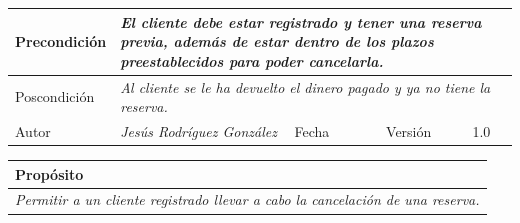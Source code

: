 \begin{table}[H]
\begin{tabular}{llllllll}
        \multicolumn{1}{|l|}{Precondición}                           & \multicolumn{7}{p{10cm}|}{{\color[HTML]{808080} \textit{El cliente debe estar registrado y tener una reserva previa, además de estar dentro de los plazos preestablecidos para poder cancelarla.}}}                                                                                                                                                                                                                                   \\ \hline
        \multicolumn{1}{|l|}{Poscondición}                           & \multicolumn{7}{p{10cm}|}{{\color[HTML]{808080} \textit{Al cliente se le ha devuelto el dinero pagado y ya no tiene la reserva.}}}                                                                                                                                                                                                                                                       \\ \hline
        \multicolumn{1}{|l|}{Autor}                                  & \multicolumn{1}{l|}{{\color[HTML]{808080} \textit{Jesús Rodríguez González}}}                           & \multicolumn{2}{l|}{Fecha}                                                   & \multicolumn{1}{l|}{}                          & \multicolumn{2}{l|}{Versión}                                                      & \multicolumn{1}{l|}{1.0}                                                     \\ \hline
        \end{tabular}
    \end{table}

    \begin{table}[H]
        \begin{tabular}{llllllll}
        \hline
        \multicolumn{8}{|l|}{\cellcolor[HTML]{F2F2F2}Propósito}                                                                                                                                                                                                                                                                                                                                                                                           \\ \hline
        \multicolumn{8}{|p{15cm}|}{{\color[HTML]{808080} \textit{Permitir a un cliente registrado llevar a cabo la cancelación de una reserva.}}}                                                                                                                                                                                                             \\ \hline
        \end{tabular}
    \end{table}

